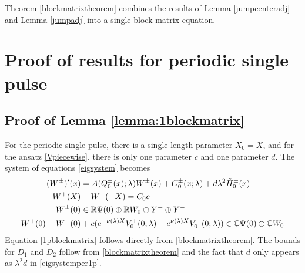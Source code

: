 \documentclass[10pt,reqno]{amsart}
\theoremstyle{plain}
\theoremstyle{definition}
\theoremstyle{remark}
\numberwithin{theorem}{section}
\numberwithin{equation}{section}
\begin{document}
Theorem \ref{blockmatrixtheorem} combines the results of Lemma \ref{jumpcenteradj} and Lemma \ref{jumpadj} into a single block matrix equation.

\section{Proof of results for periodic single pulse }\label{sec:singlepulse}

\subsection{Proof of Lemma \ref{lemma:1blockmatrix} }

For the periodic single pulse, there is a single length parameter $X_0 = X$, and for the ansatz \cref{Vpiecewise}, there is only one parameter $c$ and one parameter $d$. The system of equations \cref{eigsystem} becomes
\begin{equation}\label{eigsystemper1p}
\begin{aligned}
(W^\pm)'(x) &= A(Q_0^\pm(x); \lambda) W^\pm(x) + G_0^\pm(x; \lambda) + d \lambda^2 \tilde{H}_0^\pm(x)  \\
W^+(X) &- W^-(-X) = C_0 c \\
W^\pm(0) &\in \mathbb{R} \Psi(0) \oplus \mathbb{R} W_0 \oplus Y^+ \oplus Y^- \\
W^+(0) - W^-(0) &+ c ( e^{-\nu(\lambda)X}V_0^+(0; \lambda) - e^{\nu(\lambda)X} V_0^-(0; \lambda)) \in \mathbb{C} \Psi(0) \oplus \mathbb{C} W_0\end{aligned}
\end{equation}
Equation \cref{1pblockmatrix} follows directly from \cref{blockmatrixtheorem}. The bounds for $D_1$ and $D_2$ follow from \cref{blockmatrixtheorem} and the fact that $d$ only appears as $\lambda^2 d$ in \cref{eigsystemper1p}. 
\end{document}
